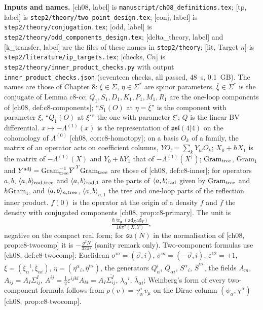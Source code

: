\documentclass[11pt]{report}
\theoremstyle{plain}
\theoremstyle{definition}
\numberwithin{equation}{chapter}
\newcommand{\unit}{\tfrac{\hbar\operatorname{tr}_{\mathfrak g}(\mathrm{ad}_X\mathrm{ad}_Y)}{16\pi^2(X,Y)}}
\newcommand{\Gt}{\mathrm{Gram}_{\rm tree}}
\newcommand{\Go}{\mathrm{Gram}_{1}}
\newcommand{\rad}{{\rm rad}}
\begin{document}
\textbf{Inputs and names.} [ch08, label] is \texttt{manuscript/ch08\_definitions.tex}; [tp, label] is \texttt{step2/theory/two\_point\_design.tex}; [conj, label] is \texttt{step2/theory/conjugation.tex}; [odd, label] is \texttt{step2/theory/odd\_components\_design.tex}; [delta\_theory, label] and [k\_transfer, label] are the files of these names in \texttt{step2/theory}; [lit, Target $n$] is \texttt{step2/literature/ip\_targets.tex}; [checks, C$n$] is \texttt{step2/theory/inner\_product\_checks.py} with output \texttt{inner\_product\_checks.json} (seventeen checks, all passed, 48~s, 0.1~GB). The names are those of Chapter 8: $\xi\in\Sigma$, $\eta\in\Sigma^*$ are spinor parameters, $\overline\xi\in\Sigma^*$ is the conjugate of Lemma c8-cc; $Q_1,S_1,D_1,K_1,P_1,M_1,R_1$ are the one-loop components of [ch08, def:c8-components]; ``$S_1(O)$ at $\eta=\overline\xi$'' is the component with parameter $\overline\xi$, ``$Q_1(O)$ at $\xi'$'' the one with parameter $\xi'$; $Q$ is the linear BV differential. $x\mapsto-\Lambda^{(1)}(x)$ is the representation of $\mathfrak{psl}(4|4)$ on the cohomology of $\Lambda^{(0)}$ [ch08, cor:c8-homotopy]; on a basis $O_k$ of a family, the matrix of an operator acts on coefficient columns, $YO_l=\sum_kY_{kl}O_k$; $X_0+\hbar X_1$ is the matrix of $-\Lambda^{(1)}(X)$ and $Y_0+\hbar Y_1$ that of $-\Lambda^{(1)}(X^\dagger)$; $\Gt$, $\Go$ and $Y^{\rm adj}=\Gt^{-1}\overline Y^{\,T}\Gt$ are those of [ch08, def:c8-inner]; for operators $a,b$, $\langle a,b\rangle_{\rad,{\rm tree}}$ and $\langle a,b\rangle_{\rad,1}$ are the parts of $\langle a,b\rangle_\rad$ given by $\Gt$ and $\hbar\Go$, and $\langle a,b\rangle_{n,{\rm tree}}$, $\langle a,b\rangle_{n,1}$ the tree and one-loop parts of the reflection inner product. $f(0)$ is the operator at the origin of a density $f$ and $\overline f$ the density with conjugated components [ch08, prop:c8-primary]. The unit is
\[
\unit ,
\]
negative on the compact real form; for $\mathfrak{su}(N)$ in the normalisation of [ch08, prop:c8-twocomp] it is $-\tfrac{g^2N}{32\pi^2}$ (sanity remark only). Two-component formulas use [ch08, def:c8-twocomp]: Euclidean $\sigma^m=(\vec\sigma,i)$, $\bar\sigma^m=(-\vec\sigma,i)$, $\varepsilon^{12}=+1$, $\xi=(\xi_\alpha{}^i,\bar\xi_{\dot\alpha i})$, $\eta=(\eta^\alpha{}_i,\bar\eta^{\dot\alpha i})$, the generators $Q^i_\alpha$, $\bar Q_{\dot\alpha i}$, $S^\alpha{}_i$, $\bar S^{\dot\alpha i}$, the fields $A_m$, $A_{ij}=A_I\Sigma^I_{ij}$, $A^{ij}=\tfrac12\varepsilon^{ijkl}A_{kl}=A_I\overline{\Sigma^I_{ij}}$, $\lambda_\alpha{}^i$, $\bar\lambda_{\dot\alpha i}$; Weinberg's form of every two-component formula follows from $\rho(v)=\gamma_W^\mu v_\mu$ on the Dirac column $(\psi_\alpha,\bar\chi^{\dot\alpha})$ [ch08, prop:c8-twocomp].
\end{document}
